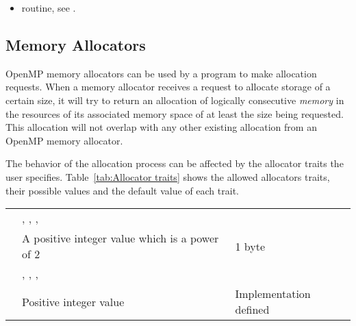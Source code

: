 \linenumbers

\crossreferences
\begin{itemize}
\item {} routine, see .
\end{itemize}

\subsection{Memory Allocators}
\label{subsec:Memory Allocators}

OpenMP memory allocators can be used by a program to make allocation requests. When a memory allocator receives a request to allocate storage of a certain size, it will try to return an allocation of logically consecutive \emph{memory} in the resources of its associated memory space of at least the size being requested. This allocation will not overlap with any other existing allocation from an OpenMP memory allocator. 

The behavior of the allocation process can be affected by the allocator traits the user specifies. Table~\ref{tab:Allocator traits} shows the allowed allocators traits, their possible values and the default value of each trait. %

\nolinenumbers
\renewcommand{\arraystretch}{1.5}
\tablelasttail{\hline}
\begin{supertabular}{p{1.2in}p{2.4in}p{1.2in}}
{} & {, , , } & {}\\
{} & A positive integer value which is a power of 2& 1 byte\\
{} & {, , , } & {}\\
{} & Positive integer value & Implementation defined\\
\end{supertabular}
\linenumbers

